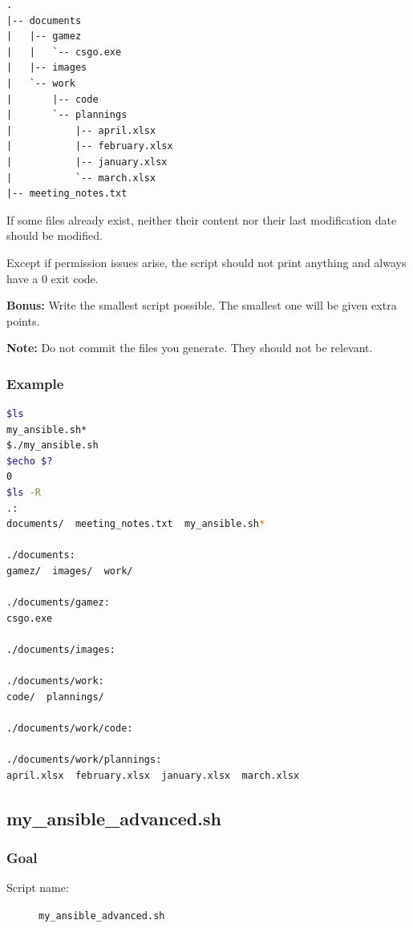 \documentclass[12pt]{article}
\begin{document}
\begin{lstlisting}
.
|-- documents
|   |-- gamez
|   |   `-- csgo.exe
|   |-- images
|   `-- work
|       |-- code
|       `-- plannings
|           |-- april.xlsx
|           |-- february.xlsx
|           |-- january.xlsx
|           `-- march.xlsx
|-- meeting_notes.txt
\end{lstlisting}

If some files already exist, neither their content nor their last modification date should be modified.

Except if permission issues arise, the script should not print anything and always have a 0 exit code.

\textbf{Bonus:} Write the smallest script possible. The smallest one will be given extra points.

\textbf{Note:} Do not commit the files you generate. They should not be relevant.

\subsubsection{Example}

\begin{lstlisting}[language=bash]
$ls
my_ansible.sh*
$./my_ansible.sh
$echo $?
0
$ls -R
.:
documents/  meeting_notes.txt  my_ansible.sh*

./documents:
gamez/  images/  work/

./documents/gamez:
csgo.exe

./documents/images:

./documents/work:
code/  plannings/

./documents/work/code:

./documents/work/plannings:
april.xlsx  february.xlsx  january.xlsx  march.xlsx
\end{lstlisting}

\subsection{my\_ansible\_advanced.sh}

\subsubsection{Goal}

\begin{description}
    \item[Script name:] \texttt{my\_ansible\_advanced.sh}
\end{description}
\end{document}
